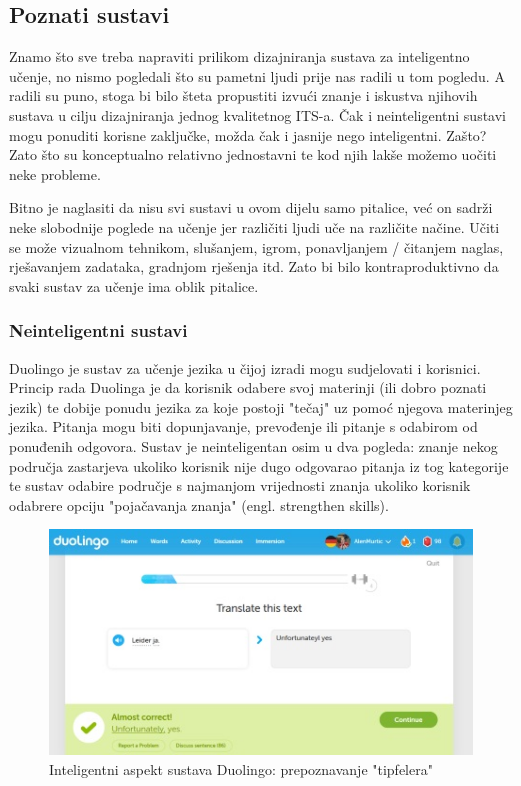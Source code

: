\documentclass[times, utf8, zavrsni, numeric]{fer}
\begin{document}
\subsection{Poznati sustavi}

Znamo što sve treba napraviti prilikom dizajniranja sustava za inteligentno učenje, no nismo pogledali što su pametni ljudi prije nas radili u tom pogledu. A radili su puno, stoga bi bilo šteta propustiti izvući znanje i iskustva njihovih sustava u cilju dizajniranja jednog kvalitetnog ITS-a. Čak i neinteligentni sustavi mogu ponuditi korisne zaključke, možda čak i jasnije nego inteligentni. Zašto? Zato što su konceptualno relativno jednostavni te kod njih lakše možemo uočiti neke probleme.
\par
Bitno je naglasiti da nisu svi sustavi u ovom dijelu samo pitalice, već on sadrži neke slobodnije poglede na učenje jer različiti ljudi uče na različite načine. Učiti se može vizualnom tehnikom, slušanjem, igrom, ponavljanjem / čitanjem naglas, rješavanjem zadataka, gradnjom rješenja itd. Zato bi bilo kontraproduktivno da svaki sustav za učenje ima oblik pitalice.

\subsubsection{Neinteligentni sustavi}

Duolingo je sustav za učenje jezika u čijoj izradi mogu sudjelovati i korisnici. Princip rada Duolinga je da korisnik odabere svoj materinji (ili dobro poznati jezik) te dobije ponudu jezika za koje postoji "tečaj" uz pomoć njegova materinjeg jezika.\cite{duolingo} Pitanja mogu biti dopunjavanje, prevođenje ili pitanje s odabirom od ponuđenih odgovora. Sustav je neinteligentan osim u dva pogleda: znanje nekog područja zastarjeva ukoliko korisnik nije dugo odgovarao pitanja iz tog kategorije te sustav odabire područje s najmanjom vrijednosti znanja ukoliko korisnik odabrere opciju "pojačavanja znanja" (engl. strengthen skills).

\begin{figure}[htb]
	\centering
	\includegraphics[]{img/duolingo.jpg}
	\caption{Inteligentni aspekt sustava Duolingo: prepoznavanje "tipfelera"}
	\label{fig:duolingo}
\end{figure}
\end{document}
